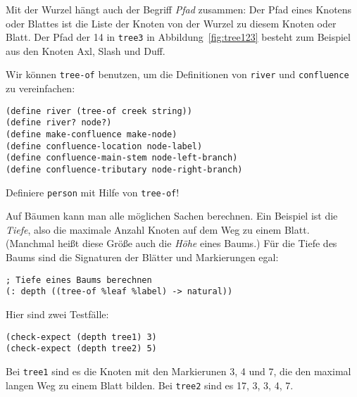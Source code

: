 Mit der Wurzel hängt auch der Begriff \textit{Pfad}
zusammen: Der Pfad eines Knotens oder Blattes ist die Liste der Knoten
von der Wurzel zu diesem Knoten oder Blatt.  Der Pfad der 14 in
\lstinline{tree3} in Abbildung~\ref{fig:tree123} besteht zum Beispiel
aus den Knoten Axl, Slash und Duff.

Wir können \lstinline{tree-of} benutzen, um die Definitionen von
\lstinline{river} und \lstinline{confluence} zu vereinfachen:
%
\begin{lstlisting}
(define river (tree-of creek string))
(define river? node?)
(define make-confluence make-node)
(define confluence-location node-label)
(define confluence-main-stem node-left-branch)
(define confluence-tributary node-right-branch)
\end{lstlisting}
%
\begin{aufgabeinline}
  Definiere \lstinline{person} mit Hilfe von \lstinline{tree-of}!
\end{aufgabeinline}
%
Auf Bäumen kann man alle möglichen Sachen berechnen.  Ein Beispiel ist
die \textit{Tiefe}, also die maximale Anzahl
Knoten auf dem Weg zu einem Blatt.  (Manchmal heißt diese Größe auch
die \textit{Höhe} eines Baums.)  Für die Tiefe
des Baums sind die Signaturen der Blätter und Markierungen egal:
%
\begin{lstlisting}
; Tiefe eines Baums berechnen
(: depth ((tree-of %leaf %label) -> natural))
\end{lstlisting}
%
Hier sind zwei Testfälle:
%
\begin{lstlisting}
(check-expect (depth tree1) 3)
(check-expect (depth tree2) 5)
\end{lstlisting}
%
Bei \lstinline{tree1} sind es die Knoten mit den Markierunen 3, 4 und
7, die den maximal langen Weg zu einem Blatt bilden.  Bei
\lstinline{tree2} sind es 17, 3, 3, 4, 7.

